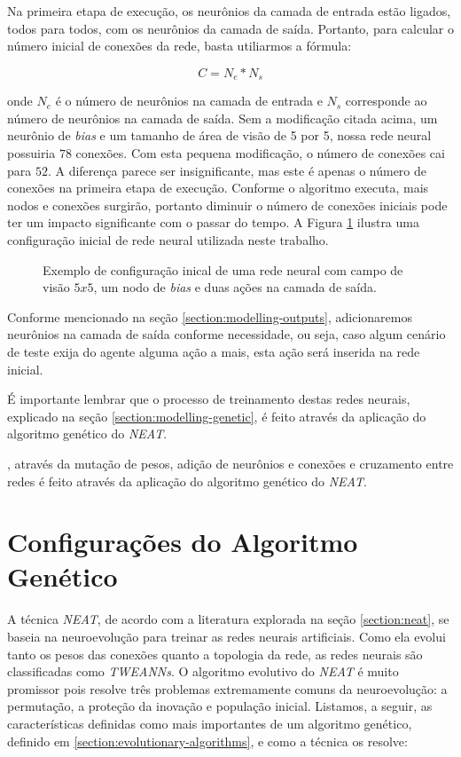 Na primeira etapa de execução, os neurônios da camada de entrada estão ligados,
todos para todos, com os neurônios da camada de saída. Portanto, para calcular o
número inicial de conexões da rede, basta utiliarmos a fórmula:

\begin{equation}
	\label{eq:network-connections}
	C = N_e * N_s
\end{equation}

onde $N_e$ é o número de neurônios na camada de entrada e $N_s$ corresponde ao
número de neurônios na camada de saída. Sem a modificação citada acima, um
neurônio de \textit{bias} e um tamanho de área de visão de 5 por 5, nossa rede
neural possuiria $78$ conexões.  Com esta pequena modificação, o número de
conexões cai para $52$. A diferença parece ser insignificante, mas este é apenas
o número de conexões na primeira etapa de execução. Conforme o algoritmo
executa, mais nodos e conexões surgirão, portanto diminuir o número de conexões
iniciais pode ter um impacto significante com o passar do tempo. A Figura
\ref{fig:modelling-network-example} ilustra uma configuração inicial de rede
neural utilizada neste trabalho.

\begin{figure}[htb!]
	\centering
	\caption{Exemplo de configuração inical de uma rede neural com campo de
	visão $5x5$, um nodo de \textit{bias} e duas ações na camada de saída.}
	\label{fig:modelling-network-example}
\end{figure}

Conforme mencionado na seção \ref{section:modelling-outputs}, adicionaremos
neurônios na camada de saída conforme necessidade, ou seja, caso algum cenário
de teste exija do agente alguma ação a mais, esta ação será inserida na rede
inicial.

É importante lembrar que o processo de treinamento destas redes neurais,
explicado na seção \ref{section:modelling-genetic}, é feito através da aplicação
do algoritmo genético do \textit{NEAT}.

, através
da mutação de pesos, adição de neurônios e conexões e cruzamento entre redes é
feito através da aplicação do algoritmo genético do \textit{NEAT}.


\section{\label{section:modelling-genetic}Configurações do Algoritmo Genético}
A técnica \textit{NEAT}, de acordo com a literatura explorada na seção
\ref{section:neat}, se baseia na neuroevolução para treinar as redes neurais
artificiais. Como ela evolui tanto os pesos das conexões quanto a topologia da
rede, as redes neurais são classificadas como \textit{TWEANNs}. O algoritmo
evolutivo do \textit{NEAT} é muito promissor pois resolve três problemas
extremamente comuns da neuroevolução: a permutação, a proteção da inovação e
população inicial. Listamos, a seguir, as características definidas como mais
importantes de um algoritmo genético, definido em
\ref{section:evolutionary-algorithms}, e como a técnica os resolve:


